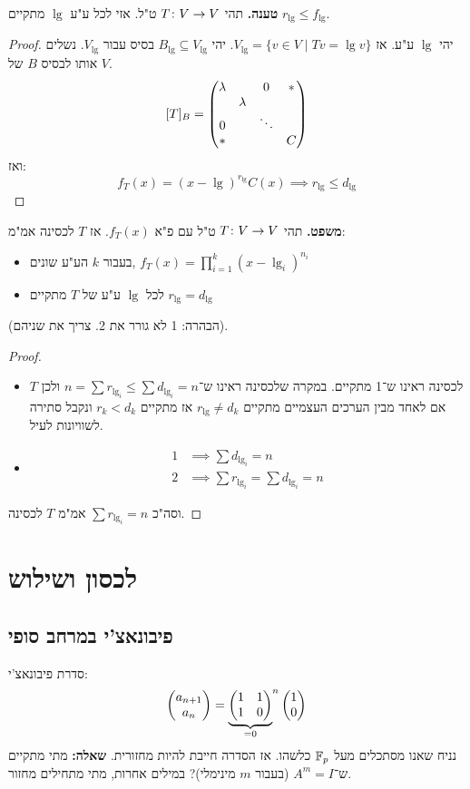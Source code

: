 \documentclass[]{../../../../tex/classes/styledArticle}
\begin{document}
	\textbf{טענה. }תהי $T \colon V \to V$ ט"ל. אזי לכל ע"ע $\lg$ מתקיים $r_\lg \le f_\lg$. 
	\begin{proof}
		יהי $\lg$ ע"ע. אז $V_\lg = \{v \in V \mid Tv = \lg v\}$. יהי $B_\lg \subseteq V_\lg$ בסיס עבור $V_\lg$. נשלים אותו לבסיס $B$ של $V$. 
		\[ [T]_B = \begin{pmatrix} \lambda & & 0 & * \\ & \lambda &  & \\ 0 && \ddots & \\ *&&& C \end{pmatrix} \]
		ואז: 
		\[ f_T(x) = (x - \lg)^{r_\lg}C(x) \implies r_\lg \le d_\lg \]
	\end{proof}
	
	\textbf{משפט. }תהי $T \colon V \to V$ ט"ל עם פ"א $f_T(x)$. אז $T$ לכסינה אמ"מ: 
	\begin{itemize}
		\item בעבור $k$ הע"ע שונים, $f_T(x) = \prod_{i = 1}^{k}(x - \lg_i)^{n_i}$
		\item לכל $\lg$ ע"ע של $T$ מתקיים $r_\lg = d_\lg$
	\end{itemize}
	(הבהרה: 1 לא גורר את 2. צריך את שניהם). 
	
	\begin{proof}\,
		\begin{itemize}
			\item[$\impliedby$]$T$ לכסינה ראינו ש־1 מתקיים. במקרה שלכסינה ראינו ש־$n = \sum r_{\lg_i} \le \sum d_{\lg_i} = n$ ולכן אם לאחד מבין הערכים העצמיים מתקיים $r_\lg \neq d_k$ אז מתקיים $r_k < d_k$ ונקבל סתירה לשוויונות  לעיל. 
			\item[$\implies$] 
			\begin{align*}
				1 &\implies \sum d_{\lg_i} = n \\
				2 &\implies \sum r_{\lg_i} = \sum d_{\lg_i} = n
			\end{align*}
		\end{itemize}
		וסה"כ $\sum r_{\lg_i} = n$ אמ"מ $T$ לכסינה. 
	\end{proof}
	
	\section{לכסון ושילוש}
	\subsection{פיבונאצ'י במרחב סופי}
	סדרת פיבונאצ'י: 
	\[ \begin{pmatrix} a_{n + 1} \\ a_n \end{pmatrix} = {\underbrace{\begin{pmatrix} 1 & 1 \\ 1 & 0 \end{pmatrix}}_{ = 0}}^{n}\begin{pmatrix} 1 \\ 0 \end{pmatrix} \]
	נניח שאנו מסתכלים מעל $\mathbb{F}_p$ כלשהו. אז הסדרה חייבת להיות מחזורית. \textbf{שאלה: }מתי מתקיים ש־$A^m = I$ (בעבור $m$ מינימלי)? במילים אחרות, מתי מתחילים מחזור. 
	
\end{document}
